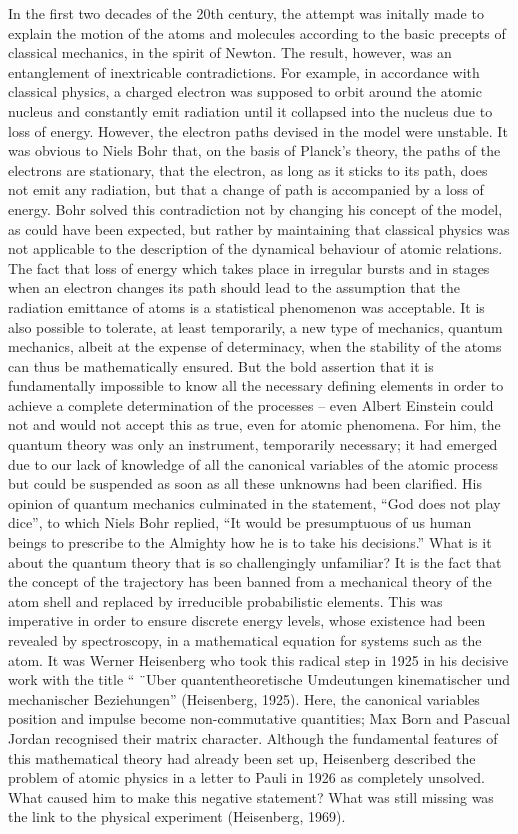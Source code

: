 \documentclass[12pt]{article}
\begin{document}
In the first two decades of the 20th century, the attempt was initally made to explain
the motion of the atoms and molecules according to the basic precepts of
classical mechanics, in the spirit of Newton. The result, however, was an entanglement
of inextricable contradictions. For example, in accordance with classical
physics, a charged electron was supposed to orbit around the atomic nucleus and
constantly emit radiation until it collapsed into the nucleus due to loss of energy.
However, the electron paths devised in the model were unstable. It was obvious
to Niels Bohr that, on the basis of Planck’s theory, the paths of the electrons are
stationary, that the electron, as long as it sticks to its path, does not emit any radiation,
but that a change of path is accompanied by a loss of energy. Bohr solved
this contradiction not by changing his concept of the model, as could have been
expected, but rather by maintaining that classical physics was not applicable to the
description of the dynamical behaviour of atomic relations. The fact that loss of
energy which takes place in irregular bursts and in stages when an electron changes
its path should lead to the assumption that the radiation emittance of atoms is
a statistical phenomenon was acceptable. It is also possible to tolerate, at least
temporarily, a new type of mechanics, quantum mechanics, albeit at the expense of
determinacy, when the stability of the atoms can thus be mathematically ensured.
But the bold assertion that it is fundamentally impossible to know all the necessary
defining elements in order to achieve a complete determination of the processes –
even Albert Einstein could not and would not accept this as true, even for atomic
phenomena. For him, the quantum theory was only an instrument, temporarily
necessary; it had emerged due to our lack of knowledge of all the canonical variables
of the atomic process but could be suspended as soon as all these unknowns
had been clarified. His opinion of quantum mechanics culminated in the statement,
“God does not play dice”, to which Niels Bohr replied, “It would be presumptuous
of us human beings to prescribe to the Almighty how he is to take his decisions.”
What is it about the quantum theory that is so challengingly unfamiliar? It is the
fact that the concept of the trajectory has been banned from a mechanical theory
of the atom shell and replaced by irreducible probabilistic elements. This was
imperative in order to ensure discrete energy levels, whose existence had been revealed
by spectroscopy, in a mathematical equation for systems such as the atom.
It was Werner Heisenberg who took this radical step in 1925 in his decisive work
with the title “ ¨Uber quantentheoretische Umdeutungen kinematischer und mechanischer
Beziehungen” (Heisenberg, 1925). Here, the canonical variables position
and impulse become non-commutative quantities; Max Born and Pascual Jordan
recognised their matrix character. Although the fundamental features of this mathematical
theory had already been set up, Heisenberg described the problem of atomic
physics in a letter to Pauli in 1926 as completely unsolved. What caused him to
make this negative statement? What was still missing was the link to the physical
experiment (Heisenberg, 1969).
\end{document}

